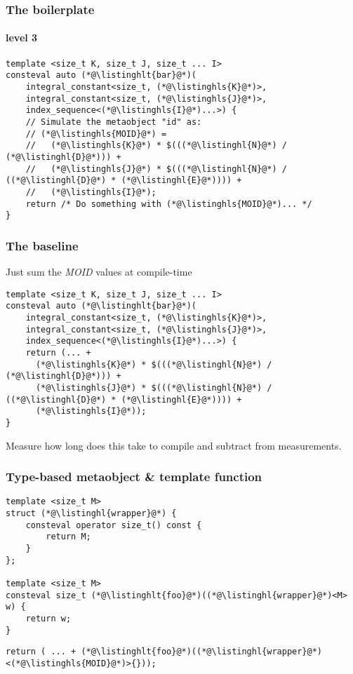 \documentclass[compress,table,xcolor=table]{beamer}
\begin{document}
\begin{frame}[fragile]
  \frametitle{The boilerplate}
  \framesubtitle{level 3}
  \begin{lstlisting}[language=c++2x,basicstyle=\normalsize\ttfamily]
template <size_t K, size_t J, size_t ... I>
consteval auto (*@\listinghlt{bar}@*)(
	integral_constant<size_t, (*@\listinghls{K}@*)>,
	integral_constant<size_t, (*@\listinghls{J}@*)>,
	index_sequence<(*@\listinghls{I}@*)...>) {
    // Simulate the metaobject "id" as:
    // (*@\listinghls{MOID}@*) = 
    //   (*@\listinghls{K}@*) * $(((*@\listinghl{N}@*) / (*@\listinghl{D}@*))) +
    //   (*@\listinghls{J}@*) * $(((*@\listinghl{N}@*) / ((*@\listinghl{D}@*) * (*@\listinghl{E}@*)))) +
    //   (*@\listinghls{I}@*);
    return /* Do something with (*@\listinghls{MOID}@*)... */
}
  \end{lstlisting}
\end{frame}
\begin{frame}[fragile]
  \frametitle{The baseline}
  Just sum the {\em MOID} values at compile-time
  \begin{lstlisting}[language=c++2x,basicstyle=\normalsize\ttfamily]
template <size_t K, size_t J, size_t ... I>
consteval auto (*@\listinghlt{bar}@*)(
	integral_constant<size_t, (*@\listinghls{K}@*)>,
	integral_constant<size_t, (*@\listinghls{J}@*)>,
	index_sequence<(*@\listinghls{I}@*)...>) {
    return (... + 
      (*@\listinghls{K}@*) * $(((*@\listinghl{N}@*) / (*@\listinghl{D}@*))) +
      (*@\listinghls{J}@*) * $(((*@\listinghl{N}@*) / ((*@\listinghl{D}@*) * (*@\listinghl{E}@*)))) +
      (*@\listinghls{I}@*));
}
  \end{lstlisting}
  Measure how long does this take to compile and subtract from 
  measurements.
\end{frame}
\begin{frame}[fragile]
  \frametitle{Type-based metaobject \& template function}
  \begin{lstlisting}[language=c++2x,basicstyle=\normalsize\ttfamily]
template <size_t M>
struct (*@\listinghl{wrapper}@*) {
	consteval operator size_t() const {
		return M;
	}
};

template <size_t M>
consteval size_t (*@\listinghlt{foo}@*)((*@\listinghl{wrapper}@*)<M> w) {
	return w;
}
  \end{lstlisting}
  \vfill
  \begin{lstlisting}[language=c++2x,basicstyle=\normalsize\ttfamily]
return ( ... + (*@\listinghlt{foo}@*)((*@\listinghl{wrapper}@*)<(*@\listinghls{MOID}@*)>{}));
  \end{lstlisting}
\end{frame}
\end{document}
